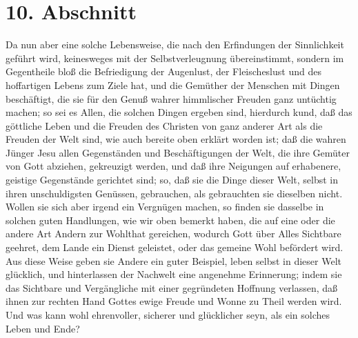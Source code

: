 \section{10. Abschnitt}

Da nun aber eine solche Lebensweise, die nach den Erfindungen der Sinnlichkeit geführt wird, keinesweges mit der Selbstverleugnung übereinstimmt, sondern im Gegentheile bloß die Befriedigung der Augenlust, der Fleischeslust und des hoffartigen Lebens zum Ziele hat, und die Gemüther der Menschen mit Dingen beschäftigt, die sie für den Genuß wahrer himmlischer Freuden ganz untüchtig machen; so sei es Allen, die solchen Dingen ergeben sind, hierdurch kund, daß das göttliche Leben und die Freuden des Christen von ganz anderer Art als die Freuden der Welt sind, wie auch bereite oben erklärt worden ist; daß die wahren Jünger Jesu allen Gegenständen und Beschäftigungen der Welt, die ihre Gemüter von Gott abziehen, gekreuzigt werden, und daß ihre Neigungen auf erhabenere, geistige Gegenstände gerichtet sind; so, daß sie die Dinge dieser Welt, selbst in ihren unschuldigsten Genüssen, gebrauchen, als gebrauchten sie dieselben nicht. Wollen sie sich aber irgend ein Vergnügen machen, so finden sie dasselbe in solchen guten Handlungen, wie wir oben bemerkt haben, die auf eine oder die andere Art Andern zur Wohlthat gereichen, wodurch Gott über Alles Sichtbare geehret, dem Lande ein Dienst geleistet, oder das gemeine Wohl befördert wird. Aus diese Weise geben sie Andere ein guter Beispiel, leben selbst in dieser Welt glücklich, und hinterlassen der Nachwelt eine angenehme Erinnerung; indem sie das Sichtbare und Vergängliche mit einer gegründeten Hoffnung verlassen, daß ihnen zur rechten Hand Gottes ewige Freude und Wonne zu Theil werden wird. Und was kann wohl ehrenvoller, sicherer und glücklicher seyn, als ein solches Leben und Ende?
